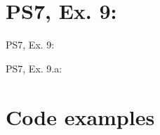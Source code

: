 \section{PS7, Ex. 9: }

\begin{frame}{PS7, Ex. 9: }
  \begin{multicols}{2}
    \vfill\null \columnbreak
    \vfill\null
  \end{multicols}
\end{frame}

\begin{frame}{PS7, Ex. 9.a: }
  \begin{multicols}{2}
    \vfill\null \columnbreak
    \vfill\null
  \end{multicols}
\end{frame}



\section{Code examples} %

